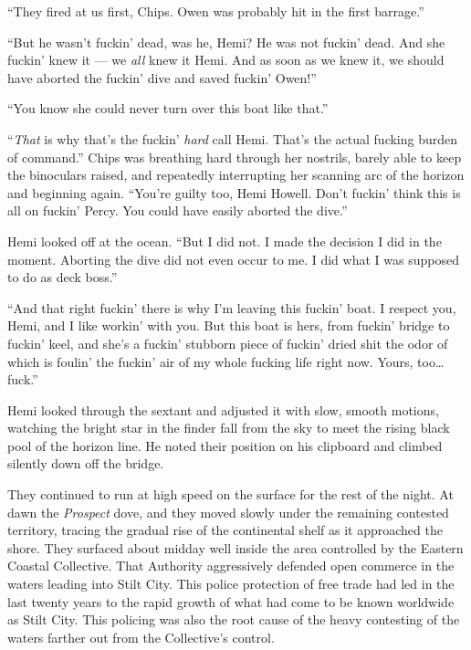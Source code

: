 \documentclass[
]{scrbook}
\begin{document}
``They fired at us first, Chips. Owen was probably hit in the first
barrage.''

``But he wasn't fuckin' dead, was he, Hemi? He was not fuckin' dead. And
she fuckin' knew it --- we \emph{all} knew it Hemi. And as soon as we
knew it, we should have aborted the fuckin' dive and saved fuckin'
Owen!''

``You know she could never turn over this boat like that.''

``\emph{That} is why that's the fuckin' \emph{hard} call Hemi. That's
the actual fucking burden of command.'' Chips was breathing hard through
her nostrils, barely able to keep the binoculars raised, and repeatedly
interrupting her scanning arc of the horizon and beginning again.
``You're guilty too, Hemi Howell. Don't fuckin' think this is all on
fuckin' Percy. You could have easily aborted the dive.''

Hemi looked off at the ocean. ``But I did not. I made the decision I did
in the moment. Aborting the dive did not even occur to me. I did what I
was supposed to do as deck boss.''

``And that right fuckin' there is why I'm leaving this fuckin' boat. I
respect you, Hemi, and I like workin' with you. But this boat is hers,
from fuckin' bridge to fuckin' keel, and she's a fuckin' stubborn piece
of fuckin' dried shit the odor of which is foulin' the fuckin' air of my
whole fucking life right now. Yours, too\ldots fuck.''

Hemi looked through the sextant and adjusted it with slow, smooth
motions, watching the bright star in the finder fall from the sky to
meet the rising black pool of the horizon line. He noted their position
on his clipboard and climbed silently down off the bridge.

\bigskip

They continued to run at high speed on the surface for the rest of the
night. At dawn the \emph{Prospect} dove, and they moved slowly under the
remaining contested territory, tracing the gradual rise of the
continental shelf as it approached the shore. They surfaced about midday
well inside the area controlled by the Eastern Coastal Collective. That
Authority aggressively defended open commerce in the waters leading into
Stilt City. This police protection of free trade had led in the last
twenty years to the rapid growth of what had come to be known worldwide
as Stilt City. This policing was also the root cause of the heavy
contesting of the waters farther out from the Collective's control.
\end{document}
